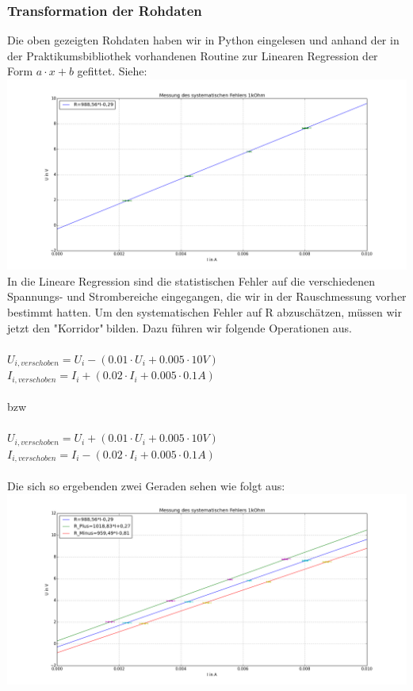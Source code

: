 \documentclass[12pt,a4paper]{article}
\begin{document}
\subsubsection{Transformation der Rohdaten}
Die oben gezeigten Rohdaten haben wir in Python eingelesen und anhand der in der Praktikumsbibliothek vorhandenen Routine zur Linearen Regression der Form $a\cdot x + b $ gefittet. Siehe:\\
\includegraphics[scale=0.35]{lin_reg_single}
\\ In die Lineare Regression sind die statistischen Fehler auf die verschiedenen Spannungs- und Strombereiche eingegangen, die wir in der Rauschmessung vorher bestimmt hatten. Um den systematischen Fehler auf R abzuschätzen, müssen wir jetzt den "Korridor"$~$bilden. Dazu führen wir folgende Operationen aus.\\
\\$U_{i,verschoben} = U_i - (0.01 \cdot U_i + 0.005 \cdot 10V)$\\
$I_{i,verschoben} = I_i + (0.02 \cdot I_i + 0.005 \cdot 0.1A)$\\
\\bzw\\
\\$U_{i,verschoben} = U_i + (0.01 \cdot U_i + 0.005 \cdot 10V)$\\
$I_{i,verschoben} = I_i - (0.02 \cdot I_i + 0.005 \cdot 0.1A)$\\
\\Die sich so ergebenden zwei Geraden sehen wie folgt aus:\\
\includegraphics[scale=0.35]{U_gegen_I.png}
\end{document}
